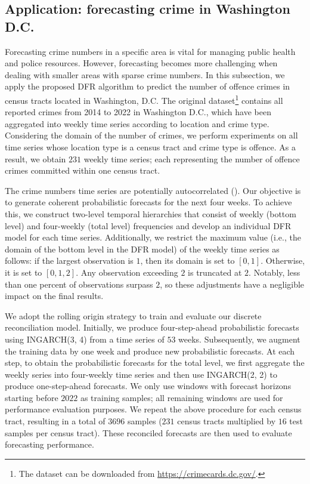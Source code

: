 \documentclass[a4paper,review,12pt,authoryear]{elsarticle}
\begin{document}
     \subsection{Application: forecasting crime in Washington D.C.}
     \label{sec:application_crime}

     Forecasting crime numbers in a specific area is vital for managing public health and police resources.
     However, forecasting becomes more challenging when dealing with smaller areas with sparse crime numbers.
     In this subsection, we apply the proposed DFR algorithm to predict the number of offence crimes in census tracts located in Washington, D.C.
     The original dataset\footnote{The dataset can be downloaded from \url{https://crimecards.dc.gov/}.} contains all reported crimes from 2014 to 2022 in Washington D.C., which have been aggregated into weekly time series according to location and crime type.
     Considering the domain of the number of crimes, we perform experiments on all time series whose location type is a census tract and crime type is offence.
     As a result, we obtain $231$ weekly time series; each representing the number of offence crimes committed within one census tract.

     The crime numbers time series are potentially autocorrelated (\citealp{aldor-noimanSpatioTemporalLowCount2013}).
     Our objective is to generate coherent probabilistic forecasts for the next four weeks.
     To achieve this, we construct two-level temporal hierarchies that consist of weekly (bottom level) and four-weekly (total level) frequencies and develop an individual DFR model for each time series.
     Additionally, we restrict the maximum value (i.e., the domain of the bottom level in the DFR model) of the weekly time series as follows: if the largest observation is $1$, then its domain is set to $[0, 1]$.
     Otherwise, it is set to $[0, 1, 2]$.
     Any observation exceeding $2$ is truncated at $2$.
     Notably, less than one percent of observations surpass $2$, so these adjustments have a negligible impact on the final results.

     We adopt the rolling origin strategy to train and evaluate our discrete reconciliation model.
     Initially, we produce four-step-ahead probabilistic forecasts using INGARCH(3, 4) from a time series of $53$ weeks.
     Subsequently, we augment the training data by one week and produce new probabilistic forecasts.
     At each step, to obtain the probabilistic forecasts for the total level, we first aggregate the weekly series into four-weekly time series and then use INGARCH(2, 2) to produce one-step-ahead forecasts.
     We only use windows with forecast horizons starting before $2022$ as training samples; all remaining windows are used for performance evaluation purposes.
     We repeat the above procedure for each census tract, resulting in a total of $3696$ samples ($231$ census tracts multiplied by $16$ test samples per census tract).
     These reconciled forecasts are then used to evaluate forecasting performance.
\end{document}
